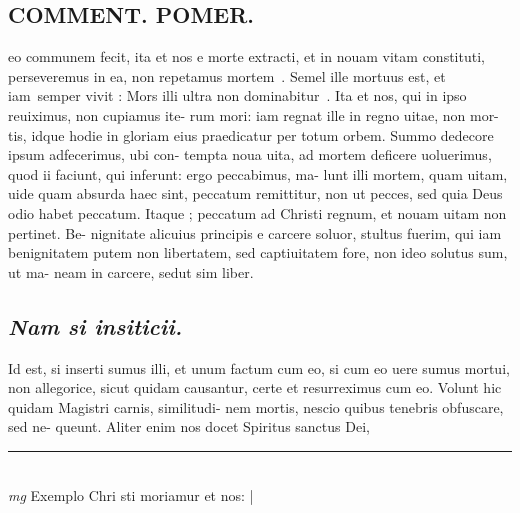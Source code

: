 \documentclass{article}
\begin{document}
\begin{pages}
\section*{COMMENT. POMER.  }\pstart eo communem fecit, ita et nos e morte extracti, et in nouam vitam constituti, perseveremus in ea, non repetamus mortem . Semel ille mortuus est, et iam semper vivit : Mors illi ultra non dominabitur .  Ita et nos, qui in ipso reuiximus, non cupiamus ite- rum mori: iam regnat ille in regno uitae, non mor- tis, idque hodie in gloriam eius praedicatur per totum orbem. Summo dedecore ipsum adfecerimus, ubi con- tempta noua uita, ad mortem deficere uoluerimus, quod ii faciunt, qui inferunt: ergo peccabimus, ma- lunt illi mortem, quam uitam, uide quam absurda haec sint, peccatum remittitur, non ut pecces, sed quia Deus odio habet peccatum. Itaque ; peccatum ad Christi regnum, et nouam uitam non pertinet. Be- nignitate alicuius principis e carcere soluor, stultus fuerim, qui iam benignitatem putem non libertatem, sed captiuitatem fore, non ideo solutus sum, ut ma- neam in carcere, sedut sim liber.   \pend
{}
{}
\subsection*{\textit{Nam si insiticii. }}\pstart Id est, si inserti sumus illi, et unum factum cum eo, si cum eo uere sumus mortui, non allegorice, sicut quidam causantur, certe et resurreximus cum eo. Volunt hic quidam Magistri carnis, similitudi- nem mortis, nescio quibus tenebris obfuscare, sed ne- queunt. Aliter enim nos docet Spiritus sanctus Dei,  \pend
\vspace{0.5cm}\noindent
\vspace{0.2cm}\rule{1cm}{0.2pt}\\ 
\hspace{0.2cm}\textit{mg}
\footnotesize Exemplo Chri sti moriamur et nos: 
\normalsize| 

\end{pages}
\end{document}
